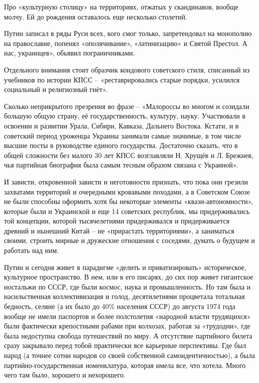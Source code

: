 Про «культурную столицу» на территориях, отжатых у скандинавов, вообще молчу.
Ей до рождения оставалось еще несколько столетий.

Путин записал в ряды Руси всех, кого смог только, запретендовал на монополию на
православие, попенял «ополячивание», «латинизацию» и Святой Престол. А нас,
украинцев», обьявил пограничниками.

Отдельного внимания стоит образчик кондового советского стиля, списанный из
учебников по истории КПСС – «реставрировались старые порядки, усилился
социальный и религиозный гнёт».

Сколько неприкрытого презрения во фразе – «Малороссы во многом и созидали
большую общую страну, её государственность, культуру, науку. Участвовали в
освоении и развитии Урала, Сибири, Кавказа, Дальнего Востока. Кстати, и в
советский период уроженцы Украины занимали самые значимые, в том числе высшие
посты в руководстве единого государства. Достаточно сказать, что в общей
сложности без малого 30 лет КПСС возглавляли Н. Хрущёв и Л. Брежнев, чья
партийная биография была самым тесным образом связана с Украиной».


И зависти, откровенной зависти и неготовности признать, что пока они грезили
захватами территорий и очередными кровавыми походами, а в Советском Союзе не
были способны оформить хотя бы некоторые элементы «квази-автономности», которые
были и Украинской и еще 14 советских республик, мы придерживались той
концепции, которой тысячелетиями придерживался и придерживается древний и
нынешний Китай – не «прирастать территориями», а заниматься своими, строить
мирные и дружеские отношения с соседями, думать о будущем и работать над ним.

Путин и сегодня живет в парадигме «делить и приватизировать» историческое,
культурное пространство. В нем, или в его писарях, до сих пор живет гигантское
ностальжи по СССР, где были космос, наука и промышленность. Но там была и
насильственная коллективизация и голод, десятилетиями процветала тотальная
бедность, селяне (а их было до 40\% населения СССР) до августа 1974 года вообще
не имели паспортов и более полстолетия «народной власти трудящихся» были
фактически крепостными рабами при колхозах, работая за «трудодни», где была
недоступна свобода путешествий по миру. А отсутствие партийного билета сразу
закрывало перед тобой практически все карьерные перспективы. Где был народ (а
точнее сотни народов со своей собственной самоидентичностью), а была
партийно-государственная номенклатура, которая имела все, что хотела. Много
чего там было, хорошего и нехорошего.

